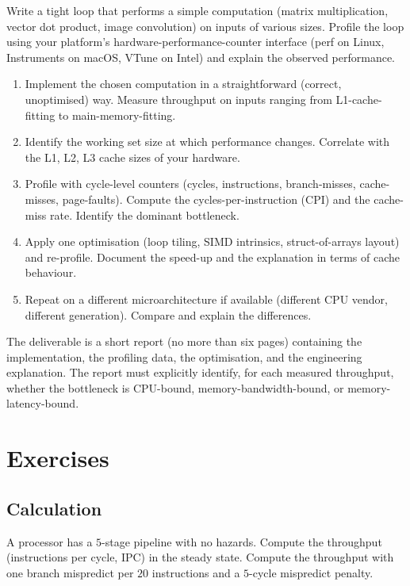 \begin{project}
Write a tight loop that performs a simple computation (matrix multiplication, vector dot product, image convolution) on inputs of various sizes. Profile the loop using your platform's hardware-performance-counter interface (perf on Linux, Instruments on macOS, VTune on Intel) and explain the observed performance.

\begin{enumerate}[leftmargin=*]
  \item Implement the chosen computation in a straightforward (correct, unoptimised) way. Measure throughput on inputs ranging from L1-cache-fitting to main-memory-fitting.
  \item Identify the working set size at which performance changes. Correlate with the L1, L2, L3 cache sizes of your hardware.
  \item Profile with cycle-level counters (cycles, instructions, branch-misses, cache-misses, page-faults). Compute the cycles-per-instruction (CPI) and the cache-miss rate. Identify the dominant bottleneck.
  \item Apply one optimisation (loop tiling, SIMD intrinsics, struct-of-arrays layout) and re-profile. Document the speed-up and the explanation in terms of cache behaviour.
  \item Repeat on a different microarchitecture if available (different CPU vendor, different generation). Compare and explain the differences.
\end{enumerate}

The deliverable is a short report (no more than six pages) containing the implementation, the profiling data, the optimisation, and the engineering explanation. The report must explicitly identify, for each measured throughput, whether the bottleneck is CPU-bound, memory-bandwidth-bound, or memory-latency-bound.
\end{project}

\section{Exercises}

\subsection*{Calculation}

\begin{exercise}
A processor has a $5$-stage pipeline with no hazards. Compute the throughput (instructions per cycle, IPC) in the steady state. Compute the throughput with one branch mispredict per $20$ instructions and a $5$-cycle mispredict penalty.
\end{exercise}

